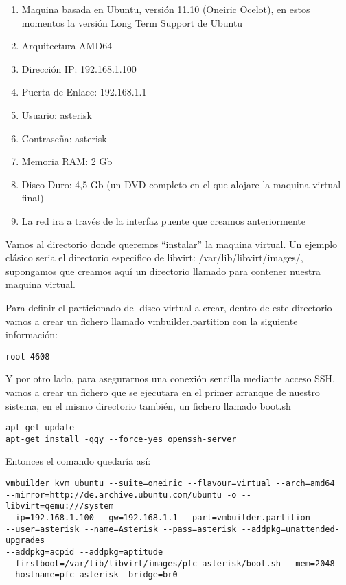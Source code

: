 \begin{enumerate}
\item Maquina basada en Ubuntu, versión 11.10 (Oneiric Ocelot), en estos momentos la versión Long Term Support de Ubuntu
\item Arquitectura AMD64
\item Dirección IP: 192.168.1.100
\item Puerta de Enlace: 192.168.1.1
\item Usuario: asterisk
\item Contraseña: asterisk
\item Memoria RAM: 2 Gb
\item Disco Duro: 4,5 Gb (un DVD completo en el que alojare la maquina virtual final)
\item La red ira a través de la interfaz puente que creamos anteriormente
\end{enumerate}

Vamos al directorio donde queremos “instalar” la maquina virtual. Un ejemplo clásico seria el directorio especifico de libvirt: /var/lib/libvirt/images/, supongamos que creamos aquí un directorio llamado  para contener nuestra maquina virtual. 

Para definir el particionado del disco virtual a crear, dentro de este directorio vamos a crear un fichero llamado vmbuilder.partition con la siguiente información:

\begin{lstlisting}[style=bash]
root 4608
\end{lstlisting}

Y por otro lado, para asegurarnos una conexión sencilla mediante acceso SSH, vamos a crear un fichero que se ejecutara en el primer arranque de nuestro sistema, en el mismo directorio también, un fichero llamado boot.sh

\begin{lstlisting}[style=bash]
apt-get update
apt-get install -qqy --force-yes openssh-server
\end{lstlisting}

Entonces el comando quedaría así:

\begin{lstlisting}[style=consola]
vmbuilder kvm ubuntu --suite=oneiric --flavour=virtual --arch=amd64 
--mirror=http://de.archive.ubuntu.com/ubuntu -o --libvirt=qemu:///system 
--ip=192.168.1.100 --gw=192.168.1.1 --part=vmbuilder.partition 
--user=asterisk --name=Asterisk --pass=asterisk --addpkg=unattended-upgrades 
--addpkg=acpid --addpkg=aptitude 
--firstboot=/var/lib/libvirt/images/pfc-asterisk/boot.sh --mem=2048 
--hostname=pfc-asterisk -bridge=br0
\end{lstlisting}

